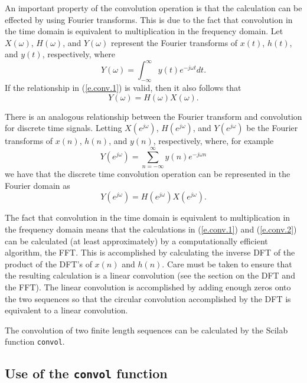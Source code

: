 	An important property of the convolution operation is that
the calculation can be effected by using Fourier transforms.
This is due to the fact that convolution in the time domain is equivalent
to multiplication in the frequency domain.  
Let $X(\omega)$, $H(\omega)$, and $Y(\omega)$ represent
the Fourier transforms of $x(t)$, $h(t)$, and $y(t)$, respectively, where
%
\begin{equation}
Y(\omega)=\int_{-\infty}^{\infty}y(t)e^{-j\omega t}dt.
\label{e.conv.6}
\end{equation}
%
If the relationship in (\ref{e.conv.1}) is valid, then it also follows that
%
\begin{equation}
Y(\omega)=H(\omega)X(\omega).
\label{e.conv.5}
\end{equation}
%

	There is an analogous relationship between the Fourier transform
and convolution for discrete time signals.  
Letting
$X(e^{j\omega})$, $H(e^{j\omega})$, and $Y(e^{j\omega})$ be the 
Fourier transforms of $x(n)$, $h(n)$, and $y(n)$, respectively, where,
for example
%
\begin{equation}
Y(e^{j\omega})=\sum_{n=-\infty}^{\infty}y(n)e^{-j\omega n}
\label{e.conv.8}
\end{equation}
%
we have that
the discrete time convolution operation can be represented in the
Fourier domain as
%
\begin{equation}
Y(e^{j\omega})=H(e^{j\omega})X(e^{j\omega}).
\label{e.conv.7}
\end{equation}
%

	
	The fact that convolution in the time domain is equivalent to
multiplication in the frequency domain means that the 
calculations in (\ref{e.conv.1}) and (\ref{e.conv.2}) can be
calculated (at least approximately) by a computationally efficient
algorithm, the FFT.
This is accomplished by calculating the inverse DFT 
of the product of the DFT's of $x(n)$ and $h(n)$. 
Care must be taken to ensure that the resulting calculation is
a linear convolution (see the section on the DFT and the FFT).  
The linear convolution is accomplished by adding enough zeros onto
the two sequences so that the circular convolution accomplished by
the DFT is equivalent to a linear convolution.

	The convolution of two finite length sequences can be
calculated by the Scilab function {\tt convol}.

\subsection{Use of the {\tt convol} function}

